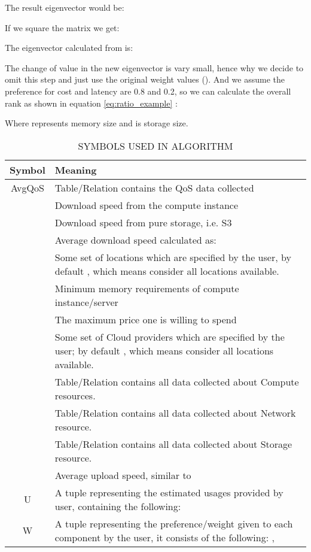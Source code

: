 \documentclass[journal]{IEEEtran}
\begin{document}
The result eigenvector would be:




If we square the matrix  we get:




The eigenvector calculated from  is:





The change of value in the new eigenvector is vary small, hence why we decide to omit this step and just use the original weight values (). And we assume the preference for cost and latency are 0.8 and 0.2, so we can calculate the overall rank as shown in equation \ref{eq:ratio_example} : 




Where  represents memory size and  is storage size.

\begin{table}[!ht]
\begin{center}\caption{SYMBOLS USED IN ALGORITHM  } \label{table:algo_symbols}
\begin{tabular}{|c|p{6cm}|}
\hline
\textbf{Symbol }&  \textbf{Meaning} \\
\hline AvgQoS &   Table/Relation contains the QoS data collected \\
\hline  &   Download speed from the compute instance \\
\hline  &   Download speed from pure storage, i.e. S3 \\
\hline  &   Average download speed calculated as:  \\
\hline  &  
  Some set of locations which are specified by the user, by default 
 , which means consider all locations available.
 \\
\hline  & Minimum memory requirements of compute instance/server  \\
\hline  &   The maximum price one is willing to spend \\
\hline  &   
 Some set of  Cloud  providers which are specified by  the user; by
default   , which means consider all locations available. \\
\hline  &  Table/Relation contains all data collected about Compute resources.  \\
\hline  &  Table/Relation contains all data collected about Network resource. \\
\hline  & Table/Relation contains all data collected about Storage resource. \\
\hline  &   Average upload speed, similar to  \\
\hline U & A tuple representing the estimated usages provided by user, containing the
following: \\
\hline W & A tuple representing the preference/weight given to each component by the user, it consists of the following: 
 ,  \\
\hline
\end{tabular}
\end{center}
\end{table}
\end{document}
